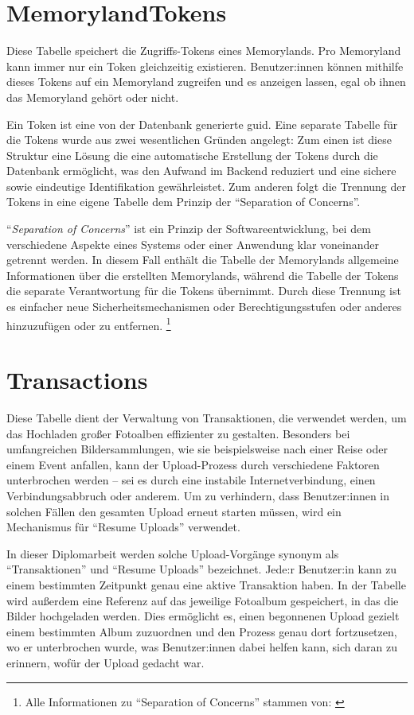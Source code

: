 \section{MemorylandTokens}

Diese Tabelle speichert die Zugriffs-Tokens eines Memorylands. Pro Memoryland kann immer nur 
ein Token gleichzeitig existieren. Benutzer:innen können mithilfe dieses Tokens auf ein 
Memoryland zugreifen und es anzeigen lassen, egal ob ihnen das Memoryland gehört oder nicht.

Ein Token ist eine von der Datenbank generierte \gls{guid}. Eine separate Tabelle für die 
Tokens wurde aus zwei wesentlichen Gründen angelegt: Zum einen ist diese Struktur eine Lösung
die eine automatische Erstellung der Tokens durch die Datenbank ermöglicht, was den 
Aufwand im Backend reduziert und eine sichere sowie eindeutige Identifikation gewährleistet. 
Zum anderen folgt die Trennung der Tokens in eine eigene Tabelle dem Prinzip der 
``Separation of Concerns''.

``\emph{Separation of Concerns}'' ist ein Prinzip der Softwareentwicklung, bei dem 
verschiedene Aspekte eines Systems oder einer Anwendung klar voneinander getrennt werden. 
In diesem Fall enthält die Tabelle der Memorylands allgemeine Informationen über die 
erstellten Memorylands, während die Tabelle der Tokens die separate Verantwortung 
für die Tokens übernimmt. Durch diese Trennung ist es einfacher neue Sicherheitsmechanismen 
oder Berechtigungsstufen oder anderes hinzuzufügen oder zu entfernen.
\footnote{Alle Informationen zu ``Separation of Concerns'' stammen von: \cite{kulkarni2003separation}}

\section{Transactions}

Diese Tabelle dient der Verwaltung von Transaktionen, die verwendet werden, um das Hochladen 
großer Fotoalben effizienter zu gestalten. Besonders bei umfangreichen Bildersammlungen, 
wie sie beispielsweise nach einer Reise oder einem Event anfallen, kann der Upload-Prozess 
durch verschiedene Faktoren unterbrochen werden -- sei es durch eine instabile 
Internetverbindung, einen Verbindungsabbruch oder anderem. Um zu verhindern, dass 
Benutzer:innen in solchen Fällen den gesamten Upload erneut starten müssen, wird ein 
Mechanismus für ``Resume Uploads'' verwendet.

In dieser Diplomarbeit werden solche Upload-Vorgänge synonym als ``Transaktionen'' und 
``Resume Uploads'' bezeichnet. Jede:r Benutzer:in kann zu einem bestimmten Zeitpunkt 
genau eine aktive Transaktion haben. In der Tabelle wird außerdem eine Referenz auf 
das jeweilige Fotoalbum gespeichert, in das die Bilder hochgeladen werden. 
Dies ermöglicht es, einen begonnenen Upload gezielt einem bestimmten Album zuzuordnen 
und den Prozess genau dort fortzusetzen, wo er unterbrochen wurde, was Benutzer:innen
dabei helfen kann, sich daran zu erinnern, wofür der Upload gedacht war.

